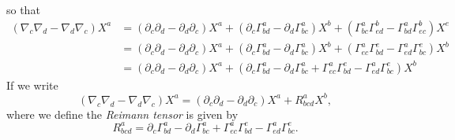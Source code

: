 so that
\begin{equation}
\begin{aligned}
\left(\nabla_{c}\nabla_{d} - \nabla_{d}\nabla_{c}\right)X^{a}
&=\left(\partial_{c}\partial_{d}-\partial_{d}\partial_{c}\right)X^{a}
+ \left(\partial_{c}\Gamma^{a}_{bd}-\partial_{d}\Gamma^{a}_{bc}\right)X^{b}
+\left(\Gamma^{a}_{bc}\Gamma^{b}_{ed}- \Gamma^{a}_{bd}\Gamma^{b}_{ec}\right)X^{e}\\
&=\left(\partial_{c}\partial_{d}-\partial_{d}\partial_{c}\right)X^{a}
+ \left(\partial_{c}\Gamma^{a}_{bd}-\partial_{d}\Gamma^{a}_{bc}\right)X^{b}
+\left(\Gamma^{a}_{ec}\Gamma^{e}_{bd}- \Gamma^{a}_{ed}\Gamma^{e}_{bc}\right)X^{b}\\
&=\left(\partial_{c}\partial_{d}-\partial_{d}\partial_{c}\right)X^{a}
+ \left(\partial_{c}\Gamma^{a}_{bd}-\partial_{d}\Gamma^{a}_{bc} + \Gamma^{a}_{ec}\Gamma^{e}_{bd}- \Gamma^{a}_{ed}\Gamma^{e}_{bc}\right)X^{b}
\end{aligned}
\end{equation}
If we write
\begin{equation}
\left(\nabla_{c}\nabla_{d} - \nabla_{d}\nabla_{c}\right)X^{a}  = \left(\partial_{c}\partial_{d} - \partial_{d}\partial_{c}\right)X^{a} + R^{a}_{bcd} X^{b},
\end{equation}
where we define the \textit{Reimann tensor} is given by
\begin{equation}
R^{a}_{bcd} = \partial_{c}\Gamma^{a}_{bd}-\partial_{d}\Gamma^{a}_{bc} + \Gamma^{a}_{ec}\Gamma^{e}_{bd}- \Gamma^{a}_{ed}\Gamma^{e}_{bc}.
\end{equation}



